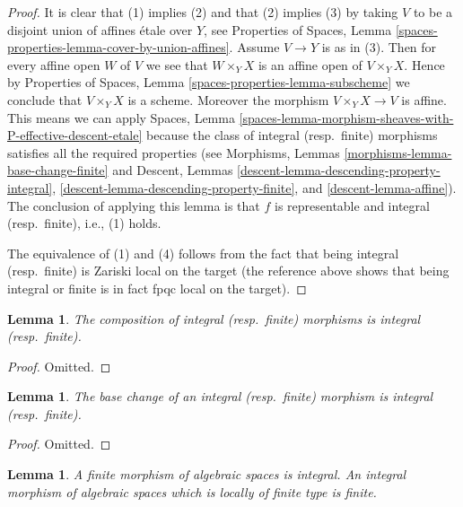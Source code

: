 \documentclass{stacks-project}
\theoremstyle{plain}
\newtheorem{lemma}[subsection]{Lemma}
\theoremstyle{definition}
\theoremstyle{remark}
\numberwithin{equation}{subsection}
\begin{document}
\begin{proof}
It is clear that (1) implies (2) and that (2) implies (3) by taking
$V$ to be a disjoint union of affines \'etale over $Y$, see
Properties of Spaces,
Lemma \ref{spaces-properties-lemma-cover-by-union-affines}.
Assume $V \to Y$ is as in (3). Then for every affine open $W$ of $V$ we see
that $W \times_Y X$ is an affine open of $V \times_Y X$. Hence by
Properties of Spaces, Lemma \ref{spaces-properties-lemma-subscheme}
we conclude that $V \times_Y X$ is a scheme. Moreover the morphism
$V \times_Y X \to V$ is affine. This means we can apply
Spaces,
Lemma \ref{spaces-lemma-morphism-sheaves-with-P-effective-descent-etale}
because the class of integral (resp.\ finite) morphisms
satisfies all the required properties (see
Morphisms, Lemmas \ref{morphisms-lemma-base-change-finite} and
Descent, Lemmas
\ref{descent-lemma-descending-property-integral},
\ref{descent-lemma-descending-property-finite},
and \ref{descent-lemma-affine}).
The conclusion of applying this lemma is that $f$ is representable
and integral (resp.\ finite), i.e., (1) holds.

\medskip\noindent
The equivalence of (1) and (4) follows from the fact that being
integral (resp.\ finite) is Zariski local on the target (the
reference above shows that being integral or finite is in fact
fpqc local on the target).
\end{proof}

\begin{lemma}
\label{lemma-composition-integral}
The composition of integral (resp.\ finite) morphisms is integral
(resp.\ finite).
\end{lemma}

\begin{proof}
Omitted.
\end{proof}

\begin{lemma}
\label{lemma-base-change-integral}
The base change of an integral (resp.\ finite) morphism is integral
(resp.\ finite).
\end{lemma}

\begin{proof}
Omitted.
\end{proof}

\begin{lemma}
\label{lemma-finite-integral}
A finite morphism of algebraic spaces is integral.
An integral morphism of algebraic spaces
which is locally of finite type is finite.
\end{lemma}
\end{document}
